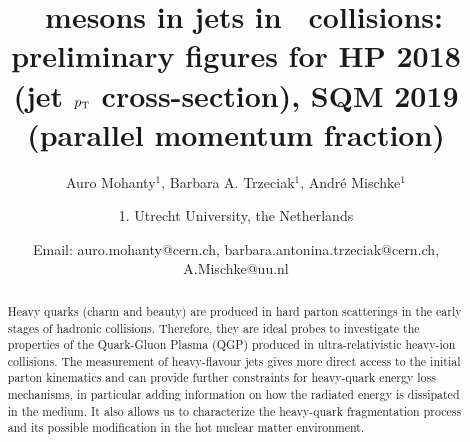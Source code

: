 \documentclass[ALICE,manyauthors]{ALICE_analysis_notes}
\begin{document}
%
%
%
\begin{titlepage}
%
\PHdate{\today}
%
\title{\Dzero\ mesons in jets in \pp\ collisions: preliminary figures for HP 2018 (jet $p_{\text T}$ cross-section), SQM 2019 (parallel momentum fraction)}
%
\author{Auro Mohanty$^{1}$, Barbara A. Trzeciak$^{1}$, Andr\'e Mischke$^{1}$}
\author{
1. Utrecht University, the Netherlands\\
}
\author{Email: auro.mohanty@cern.ch, barbara.antonina.trzeciak@cern.ch, A.Mischke@uu.nl}
%
%
\begin{abstract}

Heavy quarks (charm and beauty) are produced in hard parton scatterings in the early stages of hadronic collisions. Therefore, they are ideal probes to investigate the properties of the Quark-Gluon Plasma (QGP) produced in ultra-relativistic heavy-ion collisions. 
The measurement of heavy-flavour jets gives more direct access to the initial parton kinematics and can provide further constraints for heavy-quark energy loss mechanisms, in particular adding information on how the radiated energy is dissipated in the medium. It also allows us to characterize the heavy-quark fragmentation process and its possible modification in the hot nuclear matter environment. 
 

\end{abstract}
\end{titlepage}
\end{document}
